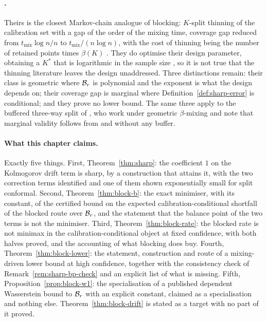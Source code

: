 \documentclass[../../../main.tex]{subfiles}
\begin{document}
\paragraph{\citet{zheng2024}.} Theirs is the closest Markov-chain analogue of blocking: $K$-split thinning of the calibration set with a gap of the order of the mixing time, coverage gap reduced from $t_{\mathrm{mix}}\log n/n$ to $t_{\mathrm{mix}}/(n\log n)$, with the cost of thinning being the number of retained points times $\beta(K)$ \citep[Prop.~5.1, p.~61475]{zheng2024}. They do optimise their design parameter, obtaining a $K^*$ that is logarithmic in the sample size \citep[Thm.~5.1, pp.~61475--61476]{zheng2024}, so it is not true that the thinning literature leaves the design unaddressed. Three distinctions remain: their class is geometric where $\mathcal B_{r}$ is polynomial and the exponent is what the design depends on; their coverage gap is marginal where Definition~\ref{def:sharp-error} is conditional; and they prove no lower bound. The same three apply to the buffered three-way split of \citet{allohibi2026}, who work under geometric $\beta$-mixing and note that marginal validity follows from \citet{oliveira2024} and \citet{barber2026} without any buffer.

\paragraph{What this chapter claims.} Exactly five things. First, Theorem~\ref{thm:sharp}: the coefficient $1$ on the Kolmogorov drift term is sharp, by a construction that attains it, with the two correction terms identified and one of them shown exponentially small for split conformal. Second, Theorem~\ref{thm:block-b}: the exact minimiser, with its constant, of the certified bound on the expected calibration-conditional shortfall of the blocked route over $\mathcal B_{r}$, and the statement that the balance point of the two terms is not the minimiser. Third, Theorem~\ref{thm:block-rate}: the blocked rate is not minimax in the calibration-conditional object at fixed confidence, with both halves proved, and the accounting of what blocking does buy. Fourth, Theorem~\ref{thm:block-lower}: the statement, construction and route of a mixing-driven lower bound at high confidence, together with the consistency check of Remark~\ref{rem:sharp-bp-check} and an explicit list of what is missing. Fifth, Proposition~\ref{prop:block-w1}: the specialisation of a published dependent Wasserstein bound to $\mathcal B_{r}$ with an explicit constant, claimed as a specialisation and nothing else. Theorem~\ref{thm:block-drift} is stated as a target with no part of it proved.
\end{document}
